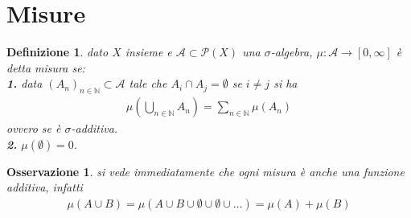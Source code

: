 \documentclass[oneside, 11pt]{amsbook}
\newcommand{\0}{{(0)}}
\newcommand{\3}{{(3)}}
\theoremstyle{colonplain}
\theoremstyle{colondefinition}
\newtheorem{defn}[thm]{Definizione}
\theoremstyle{colonremark}
\newtheorem{rmk}[thm]{Osservazione}
\numberwithin{equation}{chapter}
\begin{document}
\section{Misure}
\begin{defn}
dato $X$ insieme e $\mathcal{A} \subset \mathcal{P}(X)$ una $\sigma$-algebra, $\mu : \mathcal{A} \longrightarrow [0, \infty]$ è detta \textit{misura} se: \\
\textbf{1.} data $(A_n)_{n \in \mathbb{N}} \subset \mathcal{A}$ tale che $A_i \cap A_j = \emptyset$ se $i \neq j$ si ha
\begin{align}
    \mu\left(\bigcup_{n \in \mathbb{N}} A_n\right) = \sum_{n \in \mathbb{N}} \mu(A_n)
\end{align}
ovvero se è $\sigma$-\textit{additiva}. \\
\textbf{2.} $\mu(\emptyset) = 0$.
\end{defn}
\begin{rmk} si vede immediatamente che ogni misura è anche una funzione additiva, infatti
\begin{align}
    \mu(A \cup B) = \mu(A \cup B \cup \emptyset \cup \emptyset \cup \dots) = \mu(A) + \mu(B)
\end{align}
\end{rmk}
\end{document}
